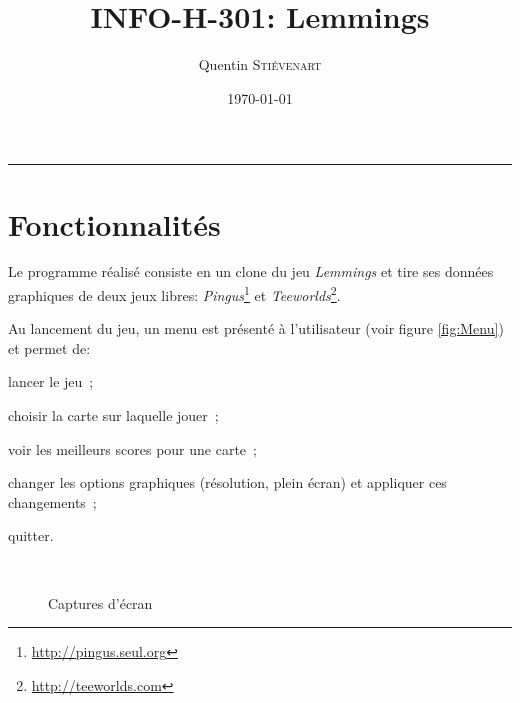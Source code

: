 \documentclass[a4paper,12pt]{article}
\title{INFO-H-301: Lemmings}
\author{Quentin \textsc{Stiévenart}}
\date{\today}
\newcommand{\HRule}{\rule{\linewidth}{0.5mm}}
\begin{document}
\maketitle

\HRule

\section{Fonctionnalités}

Le programme réalisé consiste en un clone du jeu \emph{Lemmings} et
tire ses données graphiques de deux jeux libres:
\emph{Pingus}\footnote{\url{http://pingus.seul.org}} et
\emph{Teeworlds}\footnote{\url{http://teeworlds.com}}.

Au lancement du jeu, un menu est présenté à l'utilisateur (voir figure
\ref{fig:Menu}) et permet de:
\begin{list}{-}{}
  \item lancer le jeu~;
  \item choisir la carte sur laquelle jouer~;
  \item voir les meilleurs scores pour une carte~;
  \item changer les options graphiques (résolution, plein écran) et
    appliquer ces changements~;
  \item quitter.
\end{list}


\begin{figure}[ht!]
  \centerline{
  ~~~~~~
  }
  \caption{Captures d'écran}
\end{figure}
\end{document}
